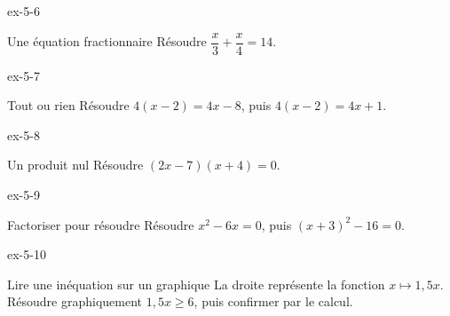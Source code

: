 \clearpage{}
\begin{blocLivre}{ex-5-6}\begin{exercice}[2]{Une équation fractionnaire}
Résoudre $\dfrac{x}{3}+\dfrac{x}{4}=14$.
\end{exercice}\end{blocLivre}
\begin{blocLivre}{ex-5-7}\begin{exercice}[2]{Tout ou rien}
Résoudre $4(x-2)=4x-8$, puis $4(x-2)=4x+1$.
\end{exercice}\end{blocLivre}
\begin{blocLivre}{ex-5-8}\begin{exercice}[2]{Un produit nul}
Résoudre $(2x-7)(x+4)=0$.
\end{exercice}\end{blocLivre}
\begin{blocLivre}{ex-5-9}\begin{exercice}[2]{Factoriser pour résoudre}
Résoudre $x^2-6x=0$, puis $(x+3)^2-16=0$.
\end{exercice}\end{blocLivre}
\begin{blocLivre}{ex-5-10}\begin{exercice}[2]{Lire une inéquation sur un graphique}
La droite représente la fonction $x\mapsto1{,}5x$. Résoudre graphiquement $1{,}5x\ge6$, puis confirmer par le calcul.
\label{fig-ex-5-10}
\end{exercice}\end{blocLivre}

